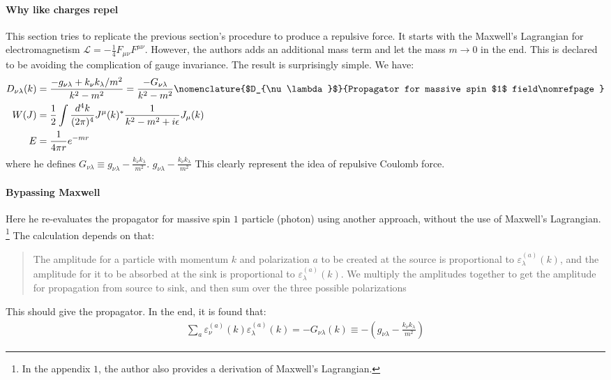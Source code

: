 \documentclass{book}
\numberwithin{equation}{subsection} %
\theoremstyle{definition}
\begin{document}
\paragraph{Why like charges repel}

This section tries to replicate the previous section's procedure to
produce a repulsive force. It starts with the Maxwell's Lagrangian for
electromagnetism $\mathcal{L}=-\frac{1}{4} F_{\mu\nu}F^{\mu\nu}$.
However, the authors adds an additional mass term and let the mass
$m\to 0$ in the end. This is declared to be avoiding the complication of
gauge invariance. The result is surprisingly simple. We have:
\begin{align}
    D_{\nu\lambda}(k)&=\frac{-g_{\nu\lambda}+k_\nu k_\lambda/m^2}
        {k^2-m^2}
        = \frac{-G_{\nu\lambda}}{k^2-m^2}
        \nomenclature{$D_{\nu\lambda}$}
            {Propagator for massive spin $1$ field\nomrefpage}
    \nonumber\\
    W(J)&=\frac{1}{2} \int \frac{d^4k}{(2\pi)^4}
        J^\mu (k)^* \frac{1}{k^2-m^2+i\epsilon} J_\mu(k)
    \nonumber\\
    E&=\frac{1}{4\pi r}e^{-mr} 
\end{align}
where he defines 
$G_{\nu\lambda}\equiv g_{\nu\lambda}-\frac{k_\nu k_\lambda}{m^2}$.
    {$g_{\nu\lambda}-\frac{k_\nu k_\lambda}{m^2}$\nomrefpage}
This clearly represent the idea of repulsive Coulomb force.

\paragraph{Bypassing Maxwell}

Here he re-evaluates the propagator for massive spin $1$ particle
(photon) using another approach, without the use of Maxwell's Lagrangian.
\footnote{
    In the appendix $1$, the author also provides a derivation of
    Maxwell's Lagrangian.
}
The calculation depends on that:
\begin{quote}
   The amplitude for a particle with momentum $k$ and polarization $a$
   to be created at the source is proportional to 
   $\varepsilon^{(a)}_\lambda(k)$, and the amplitude for it to be absorbed 
   at the sink is proportional to $\varepsilon^{(a)}_\lambda(k)$. We 
   multiply the amplitudes together to get the amplitude for
   propagation from source to sink, and then sum over the three 
   possible polarizations
\end{quote}
This should give the propagator. In the end, it is found that:
\begin{align}
    \sum_a \varepsilon^{(a)}_\nu(k) \varepsilon^{(a)}_\lambda(k)
    = - G_{\nu\lambda}(k) 
    \equiv - \left(g_{\nu\lambda}-\frac{k_\nu k_\lambda}{m^2}\right)
\end{align}
\end{document}
